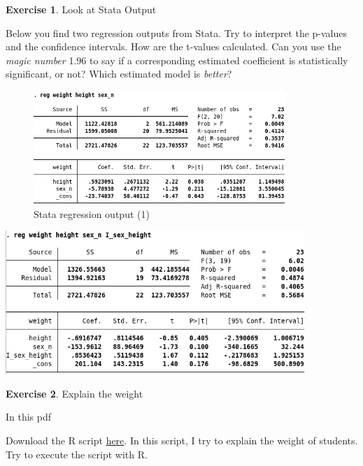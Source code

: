 \documentclass[
  12pt,
  oneside]{book}
\theoremstyle{definition}
\theoremstyle{definition}
\theoremstyle{definition}
\newtheorem{exercise}{Exercise}[chapter]
\theoremstyle{definition}
\theoremstyle{remark}
\begin{document}
\begin{exercise}
\protect\hypertarget{exr:exrstataoutput}{}\label{exr:exrstataoutput}Look at Stata Output

Below you find two regression outputs from Stata. Try to interpret the p-values and the confidence intervals. How are the t-values calculated. Can you use the \emph{magic number} 1.96 to say if a corresponding estimated coefficient is statistically significant, or not? Which estimated model is \emph{better}?

\begin{figure}
\centering
\includegraphics[width=0.85\textwidth,height=\textheight]{fig/reg_stata_class2.png}
\caption{\label{fig:regstata3} Stata regression output (1)}
\end{figure}

\includegraphics[width=0.85\textwidth,height=\textheight]{fig/reg_stata_class.png}
\end{exercise}

\begin{exercise}
\protect\hypertarget{exr:explainweight}{}\label{exr:explainweight}Explain the weight

In this pdf

Download the R script \href{https://raw.githubusercontent.com/hubchev/courses/main/scr/regress_lecture.R}{here}. In this script, I try to explain the weight of students. Try to execute the script with R.
\end{exercise}
\end{document}
